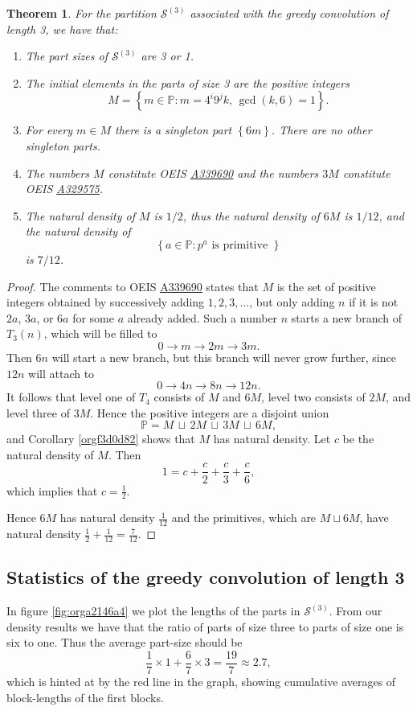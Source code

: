 \documentclass[12pt]{article}
\theoremstyle{definition}
\theoremstyle{remark}
\theoremstyle{plain}
\newtheorem{theorem}[lemma]{Theorem}
\newcommand{\set}[1]{\left\{{#1}\right\}}
\newcommand\setsuchas[2]{\left\{{#1}:{#2}\right\}}
\newcommand{\NNp}{{\mathbb{P}}}
\newcommand{\gpartition}[1]{\mathcal{S}^{(#1)}}
\newcommand{\seqnum}[1]{\href{https://oeis.org/#1}{\textrm \underline{#1}}}
\begin{document}
\begin{theorem}
For the partition \(\gpartition{3}\) associated with the greedy convolution of length 3, we have that:
\begin{enumerate}[label={(\roman*)}]
\item The part sizes of \(\gpartition{3}\) are 3 or 1.
\item The initial elements in the parts of size 3 are the positive integers
\[M= \setsuchas{m \in \NNp}{m=4^{i}9^{j}k, \, \gcd(k,6)=1}.\]
\item For every \(m \in M\) there is a singleton part \(\set{6m}\). There are no other singleton parts.
\item The numbers \(M\) constitute OEIS \seqnum{A339690} and the numbers \(3M\)
constitute OEIS \seqnum{A329575}.
\item The natural density of \(M\) is \(1/2\),
thus the natural density of \(6M\) is \(1/12\), and
the natural density of
\[\setsuchas{a \in \NNp}{p^{a} \text{ is primitive }}\]
 is \(7/12\).
\end{enumerate}
\end{theorem}
\begin{proof}
The comments to OEIS \seqnum{A339690} states that \(M\) is the set of positive integers obtained by successively adding
\(1,2,3,\dots\), but only adding \(n\) if it is not \(2a\), \(3a\), or \(6a\) for some \(a\) already added.
Such a number \(n\) starts a new branch of \(T_{3}(n)\), which will be filled to
\[0 \to m \to 2m \to 3m.\]
Then \(6n\) will start a new branch, but this branch will never grow further, since
\(12n\) will attach to
\[0 \to 4n \to 8n \to 12n.\]
It follows that level one of \(T_{4}\) consists of \(M\) and \(6M\),
level two consists of \(2M\), and level three of \(3M\).
Hence the positive integers are a disjoint union
\[\NNp = M \,\sqcup \, 2M \, \sqcup \, 3M \, \sqcup \, 6M,\]
and Corollary \ref{orgf3d0d82} shows that \(M\) has natural density.
Let \(c\) be the natural density of \(M\).  Then
\[1 = c + \frac{c}{2} + \frac{c}{3} + \frac{c}{6},\]
which implies that \(c=\frac{1}{2}\).

Hence \(6M\) has natural density \(\frac{1}{12}\) and the primitives,
which are \(M \sqcup 6M\), have natural density \(\frac{1}{2} + \frac{1}{12} = \frac{7}{12}\).
\end{proof}
\subsection{Statistics of the greedy convolution of length 3}
\label{sec:orgce26e4f}
In figure \ref{fig:orga2146a4} we plot the lengths of the parts in \(\gpartition{3}\).
From our density results we have that the ratio of parts of size three to parts of size one is six to one.
Thus the average part-size should be
\[\frac{1}{7} \times 1 + \frac{6}{7} \times 3 = \frac{19}{7} \approx 2.7,\]
which is hinted at by the red line in the graph, showing cumulative averages of block-lengths of the first blocks.
\end{document}
